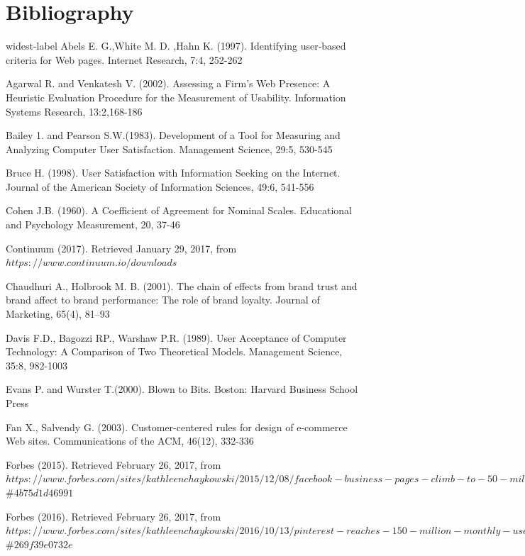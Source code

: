 \documentclass{book}
\begin{document}
\chapter{Bibliography}
\begin{thebibliography}{widest-label}
Abels E. G.,White M. D. ,Hahn K. (1997). Identifying user‐based criteria for Web pages. Internet Research, 7:4, 252-262

Agarwal R. and Venkatesh V. (2002). Assessing a Firm's Web Presence: A Heuristic Evaluation Procedure for the
Measurement of Usability. Information Systems Research, 13:2,168-186

Bailey 1. and Pearson S.W.(1983). Development of a Tool for Measuring and Analyzing Computer User Satisfaction.
Management Science, 29:5, 530-545

Bruce H. (1998). User Satisfaction with Information Seeking on the Internet. Journal of the American Society of Information Sciences, 49:6, 541-556

Cohen J.B. (1960). A Coefficient of Agreement for Nominal Scales. Educational and Psychology Measurement, 20,
37-46

Continuum (2017). Retrieved January 29, 2017, from $https://www.continuum.io/downloads$

Chaudhuri A., Holbrook M. B. (2001). The chain of effects from brand trust and brand affect to brand performance: The role of brand loyalty. Journal of Marketing, 65(4), 81–93

Davis F.D., Bagozzi RP., Warshaw P.R. (1989). User Acceptance of Computer Technology: A Comparison of
Two Theoretical Models. Management Science, 35:8, 982-1003

Evans P. and Wurster T.(2000). Blown to Bits. Boston: Harvard Business School Press

Fan X., Salvendy G. (2003). Customer-centered rules for design of e-commerce Web sites. Communications of the ACM, 46(12), 332-336

Forbes (2015). Retrieved February 26, 2017, from $https://www.forbes.com/sites/kathleenchaykowski/2015/12/08/facebook-business-pages-climb-to-50-million-with-new-messaging-tools/$\#$4b75d1d46991$

Forbes (2016). Retrieved February 26, 2017, from $https://www.forbes.com/sites/kathleenchaykowski/2016/10/13/pinterest-reaches-150-million-monthly-users/$\#$269f39e0732e$


\end{thebibliography}
\end{document}
